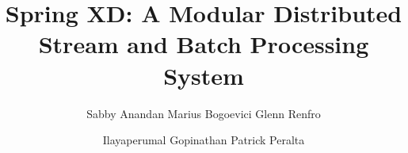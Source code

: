 \documentclass{acm_proc_article-sp}
\begin{document}
\title{Spring XD: A Modular Distributed Stream and Batch Processing System}

%
%
%
%

%
\author{
%
%
\alignauthor Sabby Anandan
\alignauthor Marius Bogoevici
\alignauthor Glenn Renfro
\and  %
\alignauthor Ilayaperumal Gopinathan
\alignauthor Patrick Peralta
}

\end{document}
